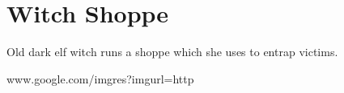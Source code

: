 \documentclass[a4paper]{dnd5}
\begin{document}
\section*{Witch Shoppe}

\begin{precis}
\item Old dark elf witch runs a shoppe which she uses to entrap victims.
\item 
\end{precis}


www.google.com/imgres?imgurl=http%



\begin{outs} 
\item 
\item 
\end{outs}

\begin{purpose}
\item 
\item 
\end{purpose}
     
\end{document}
